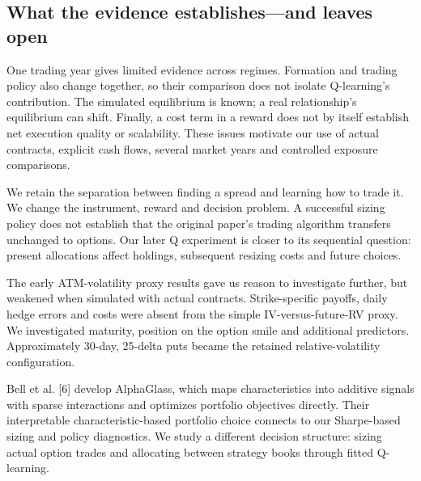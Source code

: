 \documentclass[11pt,letterpaper]{article}
\begin{document}
\subsection*{What the evidence establishes---and leaves open}
One trading year gives limited evidence across regimes. Formation and trading policy also change together, so their comparison does not isolate Q-learning's contribution. The simulated equilibrium is known; a real relationship's equilibrium can shift. Finally, a cost term in a reward does not by itself establish net execution quality or scalability. These issues motivate our use of actual contracts, explicit cash flows, several market years and controlled exposure comparisons.

\begin{center}\small{}\end{center}
We retain the separation between finding a spread and learning how to trade it. We change the instrument, reward and decision problem. A successful sizing policy does not establish that the original paper's trading algorithm transfers unchanged to options. Our later Q experiment is closer to its sequential question: present allocations affect holdings, subsequent resizing costs and future choices.

The early ATM-volatility proxy results gave us reason to investigate further, but weakened when simulated with actual contracts. Strike-specific payoffs, daily hedge errors and costs were absent from the simple IV-versus-future-RV proxy. We investigated maturity, position on the option smile and additional predictors. Approximately 30-day, 25-delta puts became the retained relative-volatility configuration.

Bell et al. [6] develop AlphaGlass, which maps characteristics into additive signals with sparse interactions and optimizes portfolio objectives directly. Their interpretable characteristic-based portfolio choice connects to our Sharpe-based sizing and policy diagnostics. We study a different decision structure: sizing actual option trades and allocating between strategy books through fitted Q-learning.
\end{document}
